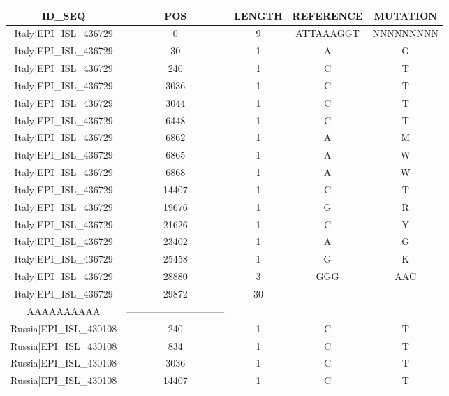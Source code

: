 \documentclass[a4paper,10pt]{article}
\begin{document}
\begin{longtable}{@{}ccccc@{}}
\toprule
\textbf{ID\_SEQ} & \textbf{POS} & \textbf{LENGTH} & \textbf{REFERENCE} & \textbf{MUTATION} \\* \midrule
\endfirsthead
%
\cline{1-5}
\endhead
%
Italy|EPI\_ISL\_436729 & 0 & 9 & ATTAAAGGT & NNNNNNNNN \\* \midrule
Italy|EPI\_ISL\_436729 & 30 & 1 & A & G \\* \midrule
Italy|EPI\_ISL\_436729 & 240 & 1 & C & T \\* \midrule
Italy|EPI\_ISL\_436729 & 3036 & 1 & C & T \\* \midrule
Italy|EPI\_ISL\_436729 & 3044 & 1 & C & T \\* \midrule
Italy|EPI\_ISL\_436729 & 6448 & 1 & C & T \\* \midrule
Italy|EPI\_ISL\_436729 & 6862 & 1 & A & M \\* \midrule
Italy|EPI\_ISL\_436729 & 6865 & 1 & A & W \\* \midrule
Italy|EPI\_ISL\_436729 & 6868 & 1 & A & W \\* \midrule
Italy|EPI\_ISL\_436729 & 14407 & 1 & C & T \\* \midrule
Italy|EPI\_ISL\_436729 & 19676 & 1 & G & R \\* \midrule
Italy|EPI\_ISL\_436729 & 21626 & 1 & C & Y \\* \midrule
Italy|EPI\_ISL\_436729 & 23402 & 1 & A & G \\* \midrule
Italy|EPI\_ISL\_436729 & 25458 & 1 & G & K \\* \midrule
Italy|EPI\_ISL\_436729 & 28880 & 3 & GGG & AAC \\* \midrule
Italy|EPI\_ISL\_436729 & 29872 & 30 & \begin{tabular}[c]{@{}c@{}}AAAAAAAAAAAAAAAAAAAA\\ AAAAAAAAAA\end{tabular} & ------------------------------ \\* \midrule
Russia|EPI\_ISL\_430108 & 240 & 1 & C & T \\* \midrule
Russia|EPI\_ISL\_430108 & 834 & 1 & C & T \\* \midrule
Russia|EPI\_ISL\_430108 & 3036 & 1 & C & T \\* \midrule
Russia|EPI\_ISL\_430108 & 14407 & 1 & C & T \\* \midrule

\end{longtable}
\end{document}
